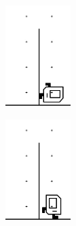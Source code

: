 \begin{sloppypar}
\begin{figure}[tbh!]
  \caption{ }
  \begin{subfigure}[t]{0.3\textwidth}
    \includegraphics[width=1in, left]{ch03/HurdleJumping/JumpOverPost1.jpg}
    \caption{}
    \label{fig:JumpOverPost1}
  \end{subfigure}
  \begin{subfigure}[t]{0.3\textwidth}
      \includegraphics[width=1in, left]{ch03/HurdleJumping/JumpOverPost2.jpg}
      \caption{}
  \end{subfigure}
  \label{fig:jumpOverAHurdlePost}
\end{figure}


\end{sloppypar}

